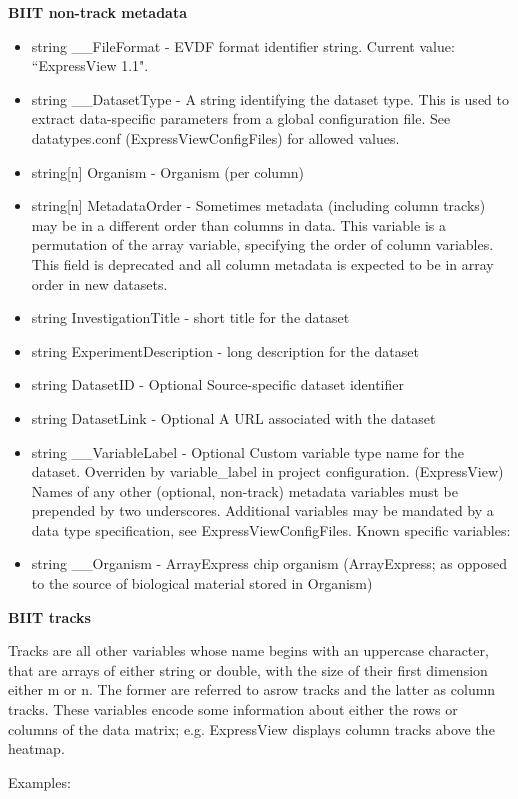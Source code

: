 \documentclass[12pt]{article}
\begin{document}
\textbf{BIIT non-track metadata}
\begin{itemize}
  \item string \_\_FileFormat - EVDF format identifier string. Current value: ``ExpressView 1.1".
  \item string \_\_DatasetType - A string identifying the dataset type. This is used to extract data-specific parameters from a global configuration file. See datatypes.conf (ExpressViewConfigFiles) for allowed values.
  \item string[n] Organism - Organism (per column)
  \item string[n] MetadataOrder - Sometimes metadata (including column tracks) may be in a different order than columns in data. This variable is a permutation of the array variable, specifying the order of column variables. This field is deprecated and all column metadata is expected to be in array order in new datasets.
  \item string InvestigationTitle - short title for the dataset
  \item string ExperimentDescription - long description for the dataset
  \item string DatasetID - Optional Source-specific dataset identifier
  \item string DatasetLink - Optional A URL associated with the dataset
  \item string \_\_VariableLabel - Optional Custom variable type name for the dataset. Overriden by variable\_label in project configuration. (ExpressView)
Names of any other (optional, non-track) metadata variables must be prepended by two underscores. Additional variables may be mandated by a data type specification, see ExpressViewConfigFiles. Known specific variables:
  \item string \_\_Organism - ArrayExpress chip organism (ArrayExpress; as opposed to the source of biological material stored in Organism)
\end{itemize}

\textbf{BIIT tracks}

Tracks are all other variables whose name begins with an uppercase character, that are arrays of either string or double, with the size of their first dimension either m or n. The former are referred to asrow tracks and the latter as column tracks. These variables encode some information about either the rows or columns of the data matrix; e.g. ExpressView displays column tracks above the heatmap.

Examples:
\end{document}
